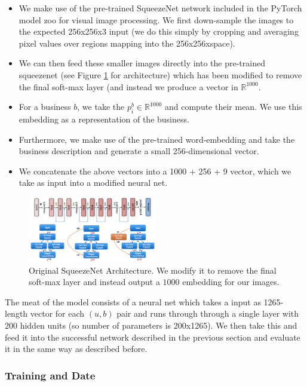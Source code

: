 \documentclass[letterpaper, 10 pt, conference]{ieeeconf}  %
\begin{document}
\begin{itemize}
\item We make use of the pre-trained SqueezeNet network included in the PyTorch model zoo for visual image processing. We first down-sample the images to the expected 256x256x3 input (we do this simply by cropping and averaging pixel values over regions mapping into the 256x256xspace).
\item We can then feed these smaller images directly into the pre-trained squeezenet (see Figure \ref{fig:squeezenet_architecture} for architecture) which has been modified to remove the final soft-max layer (and instead we produce a vector in $\mathbb{R}^1000$.
\item For a business $b$, we take the $p_i^b \in \mathbb{R}^1000$ and compute their mean. We use this embedding as a representation of the business.

\item Furthermore, we make use of the pre-trained word-embedding and take the business description and generate a small 256-dimensional vector.
\item We concatenate the above vectors into a 1000 + 256 + 9 vector, which we take as input into a modified neural net.
\end{itemize}

\begin{figure}[h!]
\centering
\includegraphics[width=0.5\textwidth]{squeezenet.jpg}
\caption{Original SqueezeNet Architecture. We modify it to remove the final soft-max layer and instead output a $1000$ embedding for our images.}
\label{fig:squeezenet_architecture}
\end{figure}

The meat of the model consists of a neural net which takes a input as 1265-length vector for each $(u,b)$ pair and runs through through a single layer with 200 hidden units (so number of parameters is 200x1265). We then take this and feed it into the successful network described in the previous section and evaluate it in the same way as described before.

\subsubsection{Training and Date}
\end{document}
